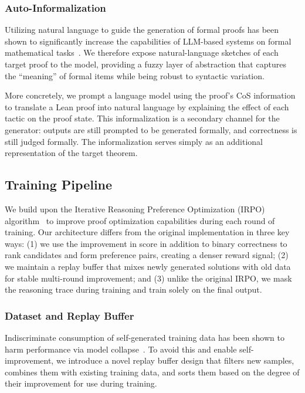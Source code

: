 \subsubsection{Auto-Informalization}
\label{ssec:auto_inform}

Utilizing natural language to guide the generation of formal proofs has been shown to significantly increase the capabilities of LLM-based systems on formal mathematical tasks~\cite{DraftSketchProve}. We therefore expose natural-language sketches of each target proof to the model, providing a fuzzy layer of abstraction that captures the ``meaning'' of formal items while being robust to syntactic variation.

More concretely, we prompt a language model using the proof's CoS information to translate a Lean proof into natural language by explaining the effect of each tactic on the proof state. This informalization is a secondary channel for the generator: outputs are still prompted to be generated formally, and correctness is still judged formally. The informalization serves simply as an additional representation of the target theorem.


\subsection{Training Pipeline}
\label{sec:training_ch}

We build upon the Iterative Reasoning Preference Optimization (IRPO) algorithm~\cite{IRPO} to improve proof optimization capabilities during each round of training. Our architecture differs from the original implementation in three key ways: (1) we use the improvement in score in addition to binary correctness to rank candidates and form preference pairs, creating a denser reward signal; (2) we maintain a replay buffer that mixes newly generated solutions with old data for stable multi-round improvement; and (3) unlike the original IRPO, we mask the reasoning trace during training and train solely on the final output.

\subsubsection{Dataset and Replay Buffer}
\label{sec:replay_buffer_ch}

Indiscriminate consumption of self-generated training data has been shown to harm performance via model collapse~\cite{modelCollapse}. To avoid this and enable self-improvement, we introduce a novel replay buffer design that filters new samples, combines them with existing training data, and sorts them based on the degree of their improvement for use during training.

